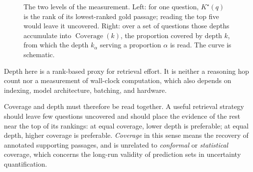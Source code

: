 \begin{figure}[htbp]
  \caption[Per-question retrieval depth and cohort coverage]{The two levels of
    the measurement. Left: for one question, \(K^{\star}(q)\) is the rank of its
    lowest-ranked gold passage; reading the top five would leave it uncovered.
    Right: over a set of questions those depths accumulate into
    \(\operatorname{Coverage}(k)\), the proportion covered by depth \(k\), from
    which the depth \(k_{\alpha}\) serving a proportion \(\alpha\) is read. The
    curve is schematic.}
  \label{fig:ranked-evidence}
\end{figure}

Depth here is a rank-based proxy for retrieval effort. It is neither a reasoning
hop count nor a measurement of wall-clock computation, which also depends on
indexing, model architecture, batching, and hardware.

Coverage and depth must therefore be read together. A useful retrieval strategy
should leave few questions uncovered and should place the evidence of the rest
near the top of its rankings: at equal coverage, lower depth is preferable; at
equal depth, higher coverage is preferable. \emph{Coverage} in this sense means
the recovery of annotated supporting passages, and is unrelated to
\emph{conformal} or \emph{statistical} coverage, which concerns the long-run
validity of prediction sets in uncertainty quantification.

